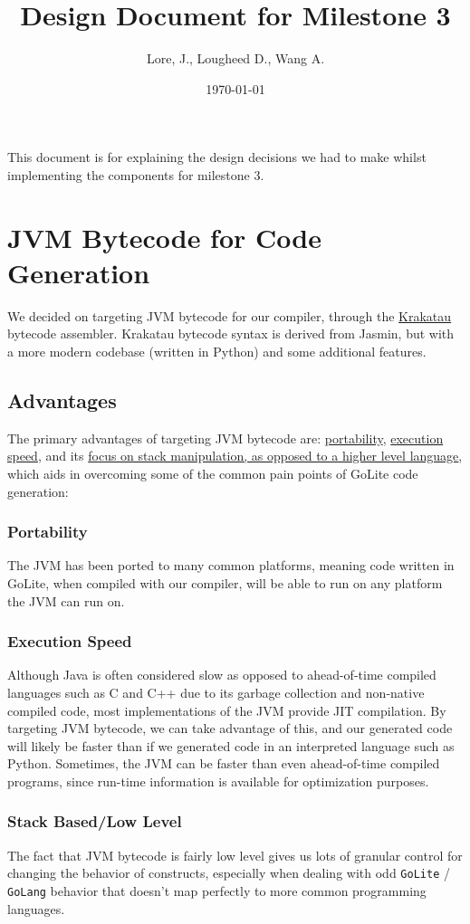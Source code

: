 \documentclass[11pt]{article}
\author{Lore, J., Lougheed D., Wang A.}
\date{\today}
\title{Design Document for Milestone 3}
\begin{document}
\maketitle
\tableofcontents

This document is for explaining the design decisions we had to make
whilst implementing the components for milestone 3.  \newpage
\section{JVM Bytecode for Code Generation}
\label{sec:org4c9274e}
We decided on targeting JVM bytecode for our compiler, through the
\href{https://github.com/Storyyeller/Krakatau}{Krakatau}
bytecode assembler. Krakatau bytecode syntax is derived from Jasmin, but with
a more modern codebase (written in Python) and some additional features.
\subsection{Advantages}
\label{sec:org8876e1e}
The primary advantages of targeting JVM bytecode are:
\hyperref[sec:org655d03c]{portability}, \hyperref[sec:orga62cb68]{execution speed},
and its \hyperref[sec:org22295d2]{focus on stack
manipulation, as opposed to a higher level language}, which
aids in overcoming some of the common pain points of GoLite code
generation:
\subsubsection{Portability}
\label{sec:org655d03c}
The JVM has been ported to many common platforms, meaning code written in
GoLite, when compiled with our compiler, will be able to run on any
platform the JVM can run on.
\subsubsection{Execution Speed}
\label{sec:orga62cb68}
Although Java is often considered slow as opposed to ahead-of-time compiled
languages such as C and C++ due to its garbage collection and non-native
compiled code, most implementations of the JVM provide JIT compilation.
By targeting JVM bytecode, we can take advantage of this, and our generated
code will likely be faster than if we generated code in an interpreted
language such as Python. Sometimes, the JVM can be faster than even
ahead-of-time compiled programs, since run-time information is available for
optimization purposes.
\subsubsection{Stack Based/Low Level}
\label{sec:org22295d2}
The fact that JVM bytecode is fairly low level gives us lots of granular
control for changing the behavior of constructs, especially when
dealing with odd \texttt{GoLite} / \texttt{GoLang} behavior that doesn't
map perfectly to more common programming languages.
\end{document}
